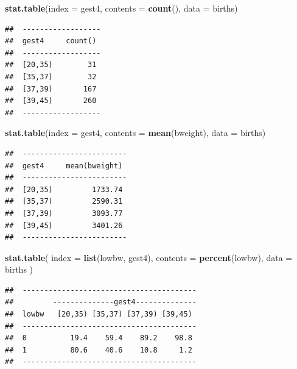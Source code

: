 \documentclass[
]{book}
\newenvironment{Shaded}{\begin{snugshade}}{\end{snugshade}}
\newcommand{\AttributeTok}[1]{\textcolor[rgb]{0.13,0.29,0.53}{#1}}
\newcommand{\FunctionTok}[1]{\textcolor[rgb]{0.13,0.29,0.53}{\textbf{#1}}}
\newcommand{\NormalTok}[1]{#1}
\theoremstyle{definition}
\theoremstyle{definition}
\theoremstyle{definition}
\theoremstyle{definition}
\theoremstyle{remark}
\begin{document}
\begin{Shaded}
\begin{Highlighting}[]
\FunctionTok{stat.table}\NormalTok{(}\AttributeTok{index =}\NormalTok{ gest4, }\AttributeTok{contents =} \FunctionTok{count}\NormalTok{(), }\AttributeTok{data =}\NormalTok{ births)}
\end{Highlighting}
\end{Shaded}

\begin{verbatim}
##  ------------------ 
##  gest4     count()  
##  ------------------ 
##  [20,35)        31  
##  [35,37)        32  
##  [37,39)       167  
##  [39,45)       260  
##  ------------------
\end{verbatim}

\begin{Shaded}
\begin{Highlighting}[]
\FunctionTok{stat.table}\NormalTok{(}\AttributeTok{index =}\NormalTok{ gest4, }\AttributeTok{contents =} \FunctionTok{mean}\NormalTok{(bweight), }\AttributeTok{data =}\NormalTok{ births)}
\end{Highlighting}
\end{Shaded}

\begin{verbatim}
##  ------------------------ 
##  gest4     mean(bweight)  
##  ------------------------ 
##  [20,35)         1733.74  
##  [35,37)         2590.31  
##  [37,39)         3093.77  
##  [39,45)         3401.26  
##  ------------------------
\end{verbatim}

\begin{Shaded}
\begin{Highlighting}[]
\FunctionTok{stat.table}\NormalTok{(}
  \AttributeTok{index =} \FunctionTok{list}\NormalTok{(lowbw, gest4), }
  \AttributeTok{contents =} \FunctionTok{percent}\NormalTok{(lowbw), }
  \AttributeTok{data =}\NormalTok{ births}
\NormalTok{)}
\end{Highlighting}
\end{Shaded}

\begin{verbatim}
##  ---------------------------------------- 
##         --------------gest4-------------- 
##  lowbw   [20,35) [35,37) [37,39) [39,45)  
##  ---------------------------------------- 
##  0          19.4    59.4    89.2    98.8  
##  1          80.6    40.6    10.8     1.2  
##  ----------------------------------------
\end{verbatim}
\end{document}
